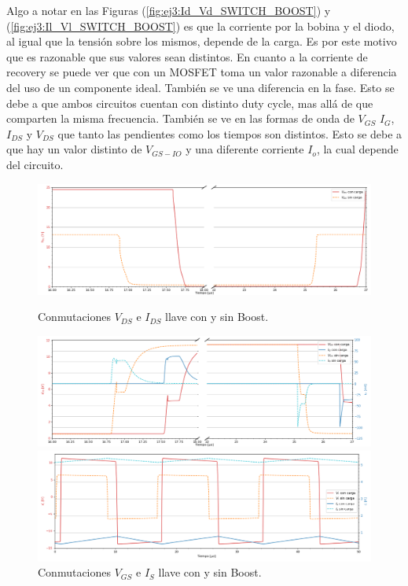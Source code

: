 Algo a notar en las Figuras (\ref{fig:ej3:Id_Vd_SWITCH_BOOST}) y (\ref{fig:ej3:Il_Vl_SWITCH_BOOST}) es que la corriente por la bobina y el diodo, al igual que la tensión sobre los mismos, depende de la carga. Es por este motivo que es razonable que sus valores sean distintos. En cuanto a la corriente de recovery se puede ver que con un MOSFET toma un valor razonable a diferencia del uso de un componente ideal. También se ve una diferencia en la fase. Esto se debe a que ambos circuitos cuentan con distinto duty cycle, mas allá de que comparten la misma frecuencia. 
También se ve en las formas de onda de $V_{GS}$ $I_G$, $I_{DS}$ y $V_{DS}$ que tanto las pendientes como los tiempos son distintos. Esto se debe a que hay un valor distinto de $V_{GS-IO}$ y una diferente corriente $I_o$, la cual depende del circuito.
\begin{figure}
	\centering
	\begin{minipage}{0.495\textwidth}
		\centering
		\includegraphics[width=\linewidth]{ImagenesEjercicio-3/ids-vds-1v3}
		\caption{Conmutaciones $V_{DS}$ e  $I_{DS}$ llave con y sin Boost.}
		\label{fig:ej3:conmutacionON_OFF_VDS_IDS_SWITCH_BOOST}
	\end{minipage}\hfill
	\begin{minipage}{0.495\textwidth}
		\centering
		\includegraphics[width=\linewidth]{ImagenesEjercicio-3/ig-vgs-1v3}
		\caption{Conmutaciones $V_{GS}$ e  $I_{S}$ llave con y sin Boost.}
		\label{fig:ej3:conmutacionON_OFF_VGS_IG_SWITCH_BOOST}
	\end{minipage}\hfill
	\begin{minipage}{0.495\textwidth}
		\centering
		\includegraphics[width=\linewidth]{ImagenesEjercicio-3/il-vl-1v3}

\end{minipage}
\end{figure}
